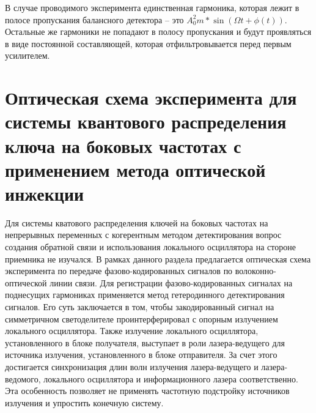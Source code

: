 В случае проводимого эксперимента единственная гармоника, которая лежит в полосе пропускания балансного детектора -- это  $A_0^2m*\sin(\Omega t   + \phi (t))$.
Остальные же гармоники не попадают в полосу пропускания и будут проявляться в виде постоянной составляющей, которая отфильтровывается перед первым усилителем. 

\section{Оптическая схема эксперимента для системы квантового распределения ключа на боковых частотах с применением метода оптической инжекции}\label{sec:ch2/sect4}
Для системы кватового распределения ключей на боковых частотах на непрерывных переменных с когерентным методом детектирования вопрос создания обратной связи и использования локального осциллятора на стороне приемника не изучался. В рамках данного раздела предлагается оптическая схема эксперимента по передаче фазово-кодированных сигналов по волоконно-оптической линии связи. Для регистрации фазово-кодированных сигналах на поднесущих гармониках применяется метод гетеродинного детектирования сигналов. Его суть заключается в том, чтобы закодированный сигнал на симметричном светоделителе проинтерферировал с опорным излучением локального осциллятора. Также излучение локального осциллятора, установленного в блоке получателя, выступает в роли лазера-ведущего для источника излучения, установленного в блоке отправителя. За счет этого достигается синхронизация длин волн излучения лазера-ведущего и лазера-ведомого, локального осциллятора и информационного лазера соответственно. Эта особенность позволяет не применять частотную подстройку источников излучения и упростить конечную систему.

